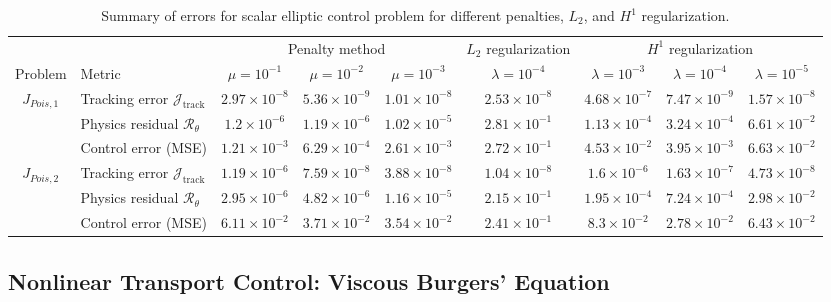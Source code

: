 \documentclass[final,1p,times]{elsarticle}
\theoremstyle{plain} %
\theoremstyle{definition} %
\theoremstyle{remark} %
\begin{document}
\begin{table}[t]
\centering
\scriptsize
\caption{Summary of errors for scalar elliptic control problem for different penalties, $L_2$, and $H^1$ regularization.}
\label{tab:summary_errors_poisson}
\renewcommand{\arraystretch}{1.15}
\setlength{\tabcolsep}{3pt}

\begin{tabular}{c l ccc c ccc}
\toprule
& & \multicolumn{3}{c}{Penalty method} & \multicolumn{1}{c}{$L_2$ regularization} & \multicolumn{3}{c}{$H^1$ regularization} \\
\cmidrule(lr){3-5}\cmidrule(lr){6-6}\cmidrule(lr){7-9}
Problem & Metric & $\mu=10^{-1}$ & $\mu=10^{-2}$ & $\mu=10^{-3}$ & $\lambda=10^{-4}$ & $\lambda=10^{-3}$ & $\lambda=10^{-4}$ & $\lambda=10^{-5}$ \\
\midrule
\multirow{3}{*}{$J_{Pois,1}$} & Tracking error $\mathcal{J}_{\text{track}}$ & $2.97\times 10^{-8}$ & $5.36\times 10^{-9}$ & $1.01\times 10^{-8}$ & $2.53\times 10^{-8}$ & $4.68\times 10^{-7}$ & $7.47\times 10^{-9}$ & $1.57\times 10^{-8}$ \\
 & Physics residual $\mathcal{R}_\theta$ & $1.2\times 10^{-6}$ & $1.19\times 10^{-6}$ & $1.02\times 10^{-5}$ & $2.81\times 10^{-1}$ & $1.13\times 10^{-4}$ & $3.24\times 10^{-4}$ & $6.61\times 10^{-2}$ \\
 & Control error (MSE) & $1.21\times 10^{-3}$ & $6.29\times 10^{-4}$ & $2.61\times 10^{-3}$ & $2.72\times 10^{-1}$ & $4.53\times 10^{-2}$ & $3.95\times 10^{-3}$ & $6.63\times 10^{-2}$ \\
\midrule
\multirow{3}{*}{$J_{Pois,2}$} & Tracking error $\mathcal{J}_{\text{track}}$ & $1.19\times 10^{-6}$ & $7.59\times 10^{-8}$ & $3.88\times 10^{-8}$ & $1.04\times 10^{-8}$ & $1.6\times 10^{-6}$ & $1.63\times 10^{-7}$ & $4.73\times 10^{-8}$ \\
 & Physics residual $\mathcal{R}_\theta$ & $2.95\times 10^{-6}$ & $4.82\times 10^{-6}$ & $1.16\times 10^{-5}$ & $2.15\times 10^{-1}$ & $1.95\times 10^{-4}$ & $7.24\times 10^{-4}$ & $2.98\times 10^{-2}$ \\
 & Control error (MSE) & $6.11\times 10^{-2}$ & $3.71\times 10^{-2}$ & $3.54\times 10^{-2}$ & $2.41\times 10^{-1}$ & $8.3\times 10^{-2}$ & $2.78\times 10^{-2}$ & $6.43\times 10^{-2}$ \\
\bottomrule
\end{tabular}
\end{table}

\subsection{Nonlinear Transport Control: Viscous Burgers' Equation}
\end{document}
